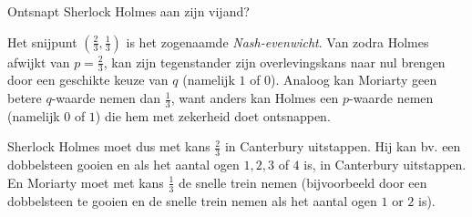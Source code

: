 \begin{lesactiviteit}{Ontsnapt Sherlock Holmes aan zijn vijand?}

Het snijpunt $\left( \frac{2}{3}, \frac{1}{3}\right)$ is het zogenaamde \emph{Nash-evenwicht}. Van zodra Holmes afwijkt van $p=\frac{2}{3}$, kan zijn tegenstander zijn overlevingskans naar nul brengen door een geschikte keuze van $q$ (namelijk $1$ of $0$). Analoog kan Moriarty geen betere $q$-waarde nemen dan $\frac{1}{3}$, want anders kan Holmes een $p$-waarde nemen (namelijk $0$ of $1$) die hem met zekerheid doet ontsnappen.

Sherlock Holmes moet dus met kans $\frac{2}{3}$ in Canterbury uitstappen. Hij kan bv. een dobbelsteen gooien en als het aantal ogen $1, 2, 3$ of $4$ is, in Canterbury uitstappen. En Moriarty moet met kans $\frac{1}{3}$ de snelle trein nemen (bijvoorbeeld door een dobbelsteen te gooien en de snelle trein nemen als het aantal ogen $1$ or $2$ is).

\begin{vraagenantwoord}[resume]

\end{vraagenantwoord}
\end{lesactiviteit}\clearpage
